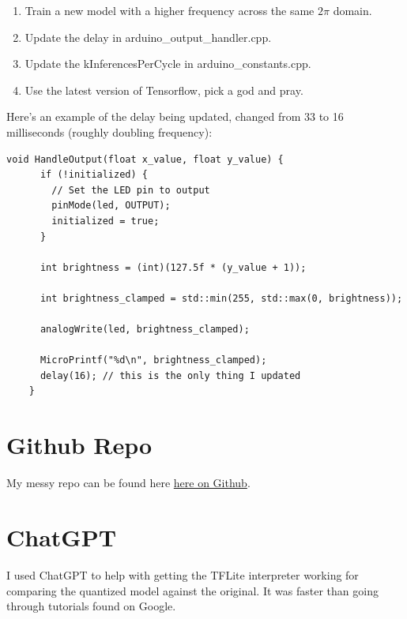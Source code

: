 \documentclass{article}
\begin{document}
    \begin{enumerate}
        \item Train a new model with a higher frequency across the same $2\pi$ domain.
        \item Update the delay in arduino\_output\_handler.cpp.
        \item Update the kInferencesPerCycle in arduino\_constants.cpp.
        \item Use the latest version of Tensorflow, pick a god and pray.
    \end{enumerate}

    Here's an example of the delay being updated, changed from 33 to 16 milliseconds (roughly doubling frequency):

    \begin{lstlisting}[label={lst:delay}]
    void HandleOutput(float x_value, float y_value) {
      if (!initialized) {
        // Set the LED pin to output
        pinMode(led, OUTPUT);
        initialized = true;
      }

      int brightness = (int)(127.5f * (y_value + 1));

      int brightness_clamped = std::min(255, std::max(0, brightness));

      analogWrite(led, brightness_clamped);

      MicroPrintf("%d\n", brightness_clamped);
      delay(16); // this is the only thing I updated
    }
    \end{lstlisting}

    \section{Github Repo}\label{sec:deliverables}
    My messy repo can be found here \href{https://github.com/crimsonmagick/cosc592\_arduino1.git}{here on Github}.

    \section{ChatGPT}\label{sec:chatgpt}

    I used ChatGPT to help with getting the TFLite interpreter working for comparing the quantized model against the original.
    It was faster than going through tutorials found on Google.

    
    
\end{document}
